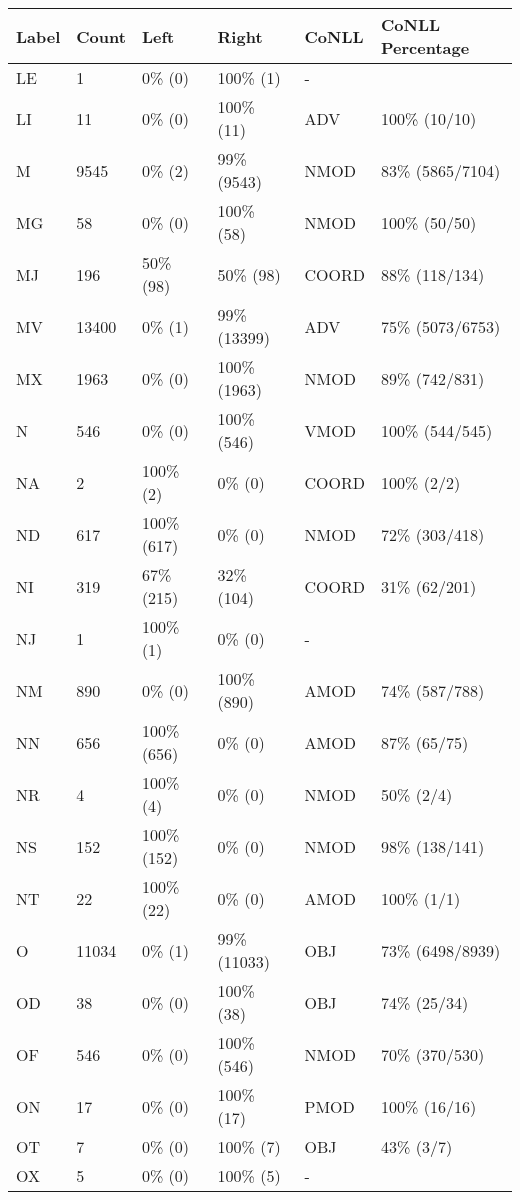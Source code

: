 \begin{figure*}
\begin{tabular}{|l|l|l|l||l|l|}
\hline
Label & Count & Left & Right & CoNLL & CoNLL Percentage\\ 
\hline
 LE & 1 & 0\% (0) & 100\% (1) & - &  \\ 
\hline
 LI & 11 & 0\% (0) & 100\% (11) & ADV & 100\% (10/10) \\ 
\hline
 M & 9545 & 0\% (2) & 99\% (9543) & NMOD & 83\% (5865/7104) \\ 
\hline
 MG & 58 & 0\% (0) & 100\% (58) & NMOD & 100\% (50/50) \\ 
\hline
 MJ & 196 & 50\% (98) & 50\% (98) & COORD & 88\% (118/134) \\ 
\hline
 MV & 13400 & 0\% (1) & 99\% (13399) & ADV & 75\% (5073/6753) \\ 
\hline
 MX & 1963 & 0\% (0) & 100\% (1963) & NMOD & 89\% (742/831) \\ 
\hline
 N & 546 & 0\% (0) & 100\% (546) & VMOD & 100\% (544/545) \\ 
\hline
 NA & 2 & 100\% (2) & 0\% (0) & COORD & 100\% (2/2) \\ 
\hline
 ND & 617 & 100\% (617) & 0\% (0) & NMOD & 72\% (303/418) \\ 
\hline
 NI & 319 & 67\% (215) & 32\% (104) & COORD & 31\% (62/201) \\ 
\hline
 NJ & 1 & 100\% (1) & 0\% (0) & - &  \\ 
\hline
 NM & 890 & 0\% (0) & 100\% (890) & AMOD & 74\% (587/788) \\ 
\hline
 NN & 656 & 100\% (656) & 0\% (0) & AMOD & 87\% (65/75) \\ 
\hline
 NR & 4 & 100\% (4) & 0\% (0) & NMOD & 50\% (2/4) \\ 
\hline
 NS & 152 & 100\% (152) & 0\% (0) & NMOD & 98\% (138/141) \\ 
\hline
 NT & 22 & 100\% (22) & 0\% (0) & AMOD & 100\% (1/1) \\ 
\hline
 O & 11034 & 0\% (1) & 99\% (11033) & OBJ & 73\% (6498/8939) \\ 
\hline
 OD & 38 & 0\% (0) & 100\% (38) & OBJ & 74\% (25/34) \\ 
\hline
 OF & 546 & 0\% (0) & 100\% (546) & NMOD & 70\% (370/530) \\ 
\hline
 ON & 17 & 0\% (0) & 100\% (17) & PMOD & 100\% (16/16) \\ 
\hline
 OT & 7 & 0\% (0) & 100\% (7) & OBJ & 43\% (3/7) \\ 
\hline
 OX & 5 & 0\% (0) & 100\% (5) & - &  \\ 

\end{tabular}
\end{figure*}
